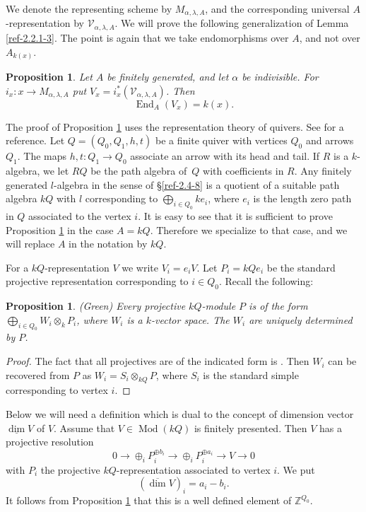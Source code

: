 \documentclass{amsart}
\numberwithin{equation}{section}
\let\cal\mathcal
\let\blb\mathbb
\newtheorem{propositions}[lemmas]{Proposition}
\theoremstyle{definition}
\theoremstyle{remark}
\begin{document}
We denote the representing
scheme by $M_{\alpha,\lambda,A}$, and the corresponding universal
$A$-representation by ${{\cal V}}_{\alpha,\lambda,A}$.
We will prove the following generalization of Lemma \ref{ref-2.2.1-3}. The point is again that we take endomorphisms over $A$, and not over $A_{k(x)}$.  
\begin{propositions} \label{ref-2.5.2-11} Let $A$ be finitely generated, and let $\alpha$ be indivisible. 
For $i_x:x{\rightarrow} M_{\alpha,\lambda,A}$ put $V_x=i_x^\ast({{\cal V}}_{\alpha,\lambda,A})$.
Then 
\begin{equation}
\label{ref-2.3-12}
{\operatorname {End}}_{A}(V_x)=k(x).
\end{equation}
\end{propositions}
The proof of Proposition \ref{ref-2.5.2-11} uses the representation theory of quivers. See \cite{Brion} for a reference. 
Let $Q=(Q_0,Q_1,h,t)$ be a finite  quiver with vertices $Q_0$ and arrows $Q_1$. The maps
$h,t:Q_1{\rightarrow} Q_0$ associate an arrow with its head and tail. 
If $R$ is a $k$-algebra, we let $RQ$ be the path algebra of~$Q$ with coefficients in $R$. 
Any finitely generated $l$-algebra
in the sense of \S\ref{ref-2.4-8} is a quotient of a suitable path algebra $kQ$
with $l$ corresponding to $\bigoplus_{i\in Q_0} ke_i$, where $e_i$ is the length zero path in $Q$ associated to
the  vertex $i$. It is easy to see that it is sufficient to prove Proposition \ref{ref-2.5.2-11}
in the case $A=kQ$. Therefore we specialize to that case, and 
we will replace $A$ in the notation by $kQ$.

For a $kQ$-representation $V$ we write $V_i=e_i V$. Let $P_i=kQe_i$ be the
standard projective representation corresponding to $i\in Q_0$.
Recall the following:
\begin{propositions} \label{ref-2.5.3-13} (Green) Every projective $kQ$-module $P$ is of
the form $\bigoplus_{i\in Q_0} W_i\otimes_k P_i$, where $W_i$ is a $k$-vector space. The $W_i$ are 
uniquely determined by $P$.
\end{propositions}
\begin{proof} The fact that all projectives are of the indicated form is \cite[Cor.\ 5.5]{Green1}.
Then $W_i$ can be recovered from $P$ as $W_i=S_i\otimes_{kQ} P$, where $S_i$ is the standard
simple corresponding to vertex $i$.
\end{proof}
Below we will need a definition which is dual to the concept of dimension vector ${\operatorname{\underline{\dim}}} V$ of $V$. Assume that
$V\in {\operatorname{Mod}}(kQ)$ is finitely presented. Then $V$ has a projective resolution
\[
0{\rightarrow} \oplus_i P_i^{\oplus b_i} {\rightarrow} \oplus_i P_i^{\oplus a_i}{\rightarrow} V{\rightarrow}0
\]
with $P_i$ the projective $kQ$-representation associated to vertex $i$. We put
\[
({\operatorname{\overline{\dim}}} V)_i=a_i-b_i.
\]
It follows from Proposition \ref{ref-2.5.3-13} that this is a well defined element of
${{\blb Z}}^{Q_0}$.
\end{document}
